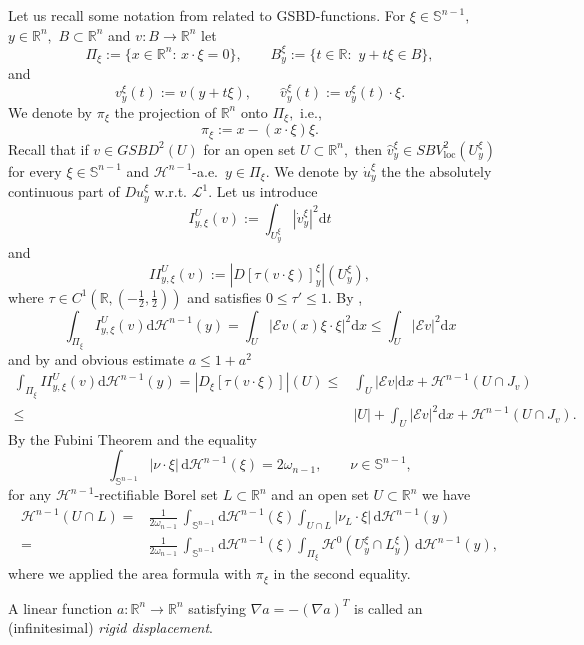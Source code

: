 \documentclass[reqno]{amsart}
\numberwithin{equation}{section}
\theoremstyle{plain}
\theoremstyle{definition}
\newcommand{\R}{\mathbb{R}}
\renewcommand{\S}{\mathbb{S}}
\newcommand{\cH}{\mathcal{H}}
\newcommand{\cL}{\mathcal{L}}
\renewcommand{\d}{\mathrm{d}}
\renewcommand{\hat}{\widehat}
\newcommand{\loc}{\mathrm{loc}}
\newcommand{\str}[1]{\mathcal{E}#1}
\begin{document}
Let us recall some   notation from \cite{ChC:2020_jems} related to GSBD-functions. For $\xi\in\S^{n-1},$ $y\in\R^n,$  $B\subset\R^n$ and $v:B\to\R^n$ let 
$$
\Pi_\xi:=\{x\in\R^n:\,x\cdot\xi=0\},\qquad B_y^\xi:=\{t\in\R:\,\,y+t\xi\in B\},
$$
and
$$
v_y^\xi(t):=v(y+t\xi),\qquad \hat v_y^\xi(t):=v_y^\xi(t)\cdot \xi.
$$ 
We denote by $\pi_\xi$ the projection of $\R^n$ onto $\Pi_\xi,$ i.e., 
$$
\pi_\xi:=x - (x\cdot\xi) \xi .
$$
Recall that if $v\in GSBD^2(U)$ for an open set $U\subset\R^n,$  then $\hat v_y^\xi \in SBV^2_\loc(U_y^\xi)$ for every $\xi\in\S^{n-1}$ and $\cH^{n-1}$-a.e.\  $y\in\Pi_\xi.$  We denote by $\dot u_y^\xi$ the the absolutely continuous part of $D u_y^\xi$ w.r.t. $\cL^1.$ Let us introduce 
$$
I_{y,\xi}^U (v):=\int_{U_y^\xi} |\dot v_y^\xi|^2\d t 
$$
%
and
$$
II_{y,\xi}^U(v):=|D[\tau(v\cdot \xi)]_y^\xi|(U_y^\xi),
$$
%
where $\tau\in  C^1(\R,(-\frac12,\frac12))$ and satisfies $0\le \tau'\le1.$
By \cite[Eq. 3.8]{ChC:2020_jems},
%
\begin{equation}\label{estimate_I}
\int_{\Pi_\xi} I_{y,\xi}^U(v)\d\cH^{n-1}(y) = \int_U |\str{v}(x)\xi\cdot \xi|^2\d x \le \int_U |\str{v}|^2\d x   
\end{equation}
%
and by \cite[Eq. 3.9]{ChC:2020_jems} and obvious estimate $a\le 1+a^2$
%
\begin{align}
\int_{\Pi_\xi} II_{y,\xi}^U(v)\d\cH^{n-1}(y) =  |D_\xi[\tau(v\cdot\xi)]|(U) \le & \int_U |\str{v}|\d x  + \cH^{n-1}(U\cap J_v)\nonumber \\
\le & |U| + \int_U |\str{v}|^2\d x  + \cH^{n-1}(U\cap J_v). \label{estimate_II}
\end{align}
%
By the Fubini Theorem and the equality 
$$
\int_{\S^{n-1}} |\nu \cdot \xi|\,\d\cH^{n-1}(\xi)=2\omega_{n-1},\qquad \nu\in\S^{n-1},
$$
for any $\cH^{n-1}$-rectifiable Borel set $L\subset\R^n$ and an open set $U\subset\R^n$ we have  
%
\begin{align}
\cH^{n-1}(U\cap L) = & \frac{1}{2\omega_{n-1}}\,\int_{\S^{n-1}} \d\cH^{n-1}(\xi) \int_{U\cap L} |\nu_L\cdot \xi|\,\d\cH^{n-1}(y)\nonumber \\
=& \frac{1}{2\omega_{n-1}}\,\int_{\S^{n-1}} \d\cH^{n-1}(\xi) \int_{\Pi_\xi} \cH^0(U_y^\xi\cap L_y^\xi)\,\d\cH^{n-1}(y), \label{jump_estimate}
\end{align}
%
where we applied the area formula with $\pi_\xi$ in the second equality.





A linear function $a:\R^n\to\R^n$ satisfying $\nabla a= - (\nabla a)^T$ is called an (infinitesimal) \emph{rigid displacement}.
 
\end{document}
